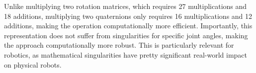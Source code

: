 Unlike multiplying two rotation matrices, which requires 27 multiplications and 18 additions, multiplying two quaternions only requires 16 multiplications and 12 additions, making the operation computationally more efficient.
Importantly, this representation does not suffer from singularities for specific joint angles, making the approach computationally more robust. This is particularly relevant for robotics, as mathematical singularities have pretty significant real-world impact on physical robots.


